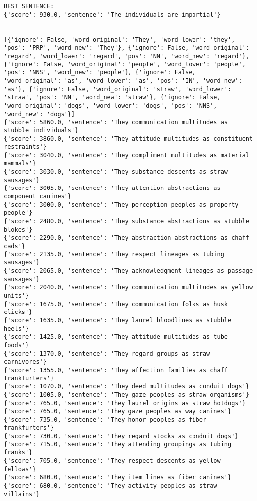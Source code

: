 \documentclass[12pt,a4paper,oneside]{book}
\begin{document}
\begin{verbatim}
BEST SENTENCE:
{'score': 930.0, 'sentence': 'The individuals are impartial'}


[{'ignore': False, 'word_original': 'They', 'word_lower': 'they', 'pos': 'PRP', 'word_new': 'They'}, {'ignore': False, 'word_original': 'regard', 'word_lower': 'regard', 'pos': 'NN', 'word_new': 'regard'}, {'ignore': False, 'word_original': 'people', 'word_lower': 'people', 'pos': 'NNS', 'word_new': 'people'}, {'ignore': False, 'word_original': 'as', 'word_lower': 'as', 'pos': 'IN', 'word_new': 'as'}, {'ignore': False, 'word_original': 'straw', 'word_lower': 'straw', 'pos': 'NN', 'word_new': 'straw'}, {'ignore': False, 'word_original': 'dogs', 'word_lower': 'dogs', 'pos': 'NNS', 'word_new': 'dogs'}]
{'score': 5860.0, 'sentence': 'They communication multitudes as stubble individuals'}
{'score': 3860.0, 'sentence': 'They attitude multitudes as constituent restraints'}
{'score': 3040.0, 'sentence': 'They compliment multitudes as material mammals'}
{'score': 3030.0, 'sentence': 'They substance descents as straw sausages'}
{'score': 3005.0, 'sentence': 'They attention abstractions as component canines'}
{'score': 3000.0, 'sentence': 'They perception peoples as property people'}
{'score': 2480.0, 'sentence': 'They substance abstractions as stubble blokes'}
{'score': 2290.0, 'sentence': 'They abstraction abstractions as chaff cads'}
{'score': 2135.0, 'sentence': 'They respect lineages as tubing sausages'}
{'score': 2065.0, 'sentence': 'They acknowledgment lineages as passage sausages'}
{'score': 2040.0, 'sentence': 'They communication multitudes as yellow units'}
{'score': 1675.0, 'sentence': 'They communication folks as husk clicks'}
{'score': 1635.0, 'sentence': 'They laurel bloodlines as stubble heels'}
{'score': 1425.0, 'sentence': 'They attitude multitudes as tube foods'}
{'score': 1370.0, 'sentence': 'They regard groups as straw carnivores'}
{'score': 1355.0, 'sentence': 'They affection families as chaff frankfurters'}
{'score': 1070.0, 'sentence': 'They deed multitudes as conduit dogs'}
{'score': 1005.0, 'sentence': 'They gaze peoples as straw organisms'}
{'score': 765.0, 'sentence': 'They laurel origins as straw hotdogs'}
{'score': 765.0, 'sentence': 'They gaze peoples as way canines'}
{'score': 735.0, 'sentence': 'They honor peoples as fiber frankfurters'}
{'score': 730.0, 'sentence': 'They regard stocks as conduit dogs'}
{'score': 715.0, 'sentence': 'They attending groupings as tubing franks'}
{'score': 705.0, 'sentence': 'They respect descents as yellow fellows'}
{'score': 680.0, 'sentence': 'They item lines as fiber canines'}
{'score': 680.0, 'sentence': 'They activity peoples as straw villains'}

\end{verbatim}
\end{document}
